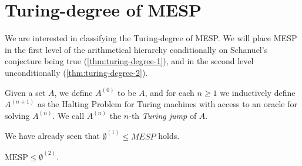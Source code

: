 \section{Turing-degree of MESP}
\label{sec:turing-degree-lics}

We are interested in classifying the Turing-degree of MESP\@.
We will place MESP in the first level of the arithmetical hierarchy conditionally on Schanuel's conjecture being true (\cref{thm:turing-degree-1}), and in the second level unconditionally (\cref{thm:turing-degree-2}).

Given a set $A$, we define $A^{(0)}$ to be $A$, and for each $n \geq 1$ we inductively define $A^{(n+1)}$ as the Halting Problem for Turing machines with access to an oracle for solving $A^{(n)}$. We call $A^{(n)}$ the $n$-th \emph{Turing jump} of $A$.

We have already seen that $\emptyset^{(1)} \leq MESP$ holds.

\begin{theorem}
\label{thm:turing-degree-2}
$\mbox{MESP} \leq \emptyset^{(2)}$.
\end{theorem}

